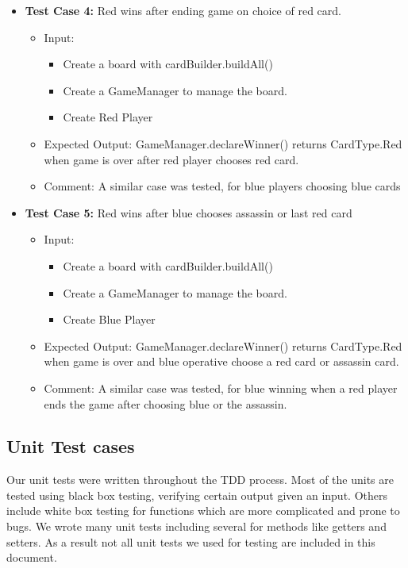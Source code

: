 \documentclass[12pt]{article}
\begin{document}
\begin{itemize}
    \item \textbf{Test Case 4:} Red wins after ending game on choice of red card.
        \begin{itemize}
        \item Input:
            \begin{itemize}
                \item Create a board with cardBuilder.buildAll()
                \item Create a GameManager to manage the board.
                \item Create Red Player
            \end{itemize}
        \item Expected Output: GameManager.declareWinner() returns CardType.Red when game is over after red player chooses red card.
        \item Comment: A similar case was tested, for blue players choosing blue cards
    \end{itemize}
    
    \item \textbf{Test Case 5:} Red wins after blue chooses assassin or last red card
        \begin{itemize}
        \item Input:
            \begin{itemize}
                \item Create a board with cardBuilder.buildAll()
                \item Create a GameManager to manage the board.
                \item Create Blue Player
            \end{itemize}
        \item Expected Output: GameManager.declareWinner() returns CardType.Red when game is over and blue operative choose a red card or assassin card.
        \item Comment: A similar case was tested, for blue winning when a red player ends the game after choosing blue or the assassin.
    \end{itemize}

\end{itemize}


\subsection{Unit Test cases}

Our unit tests were written throughout the TDD process. Most of the units are tested using black box testing, verifying certain output given an input. Others include white box testing for functions which are more complicated and prone to bugs. We wrote many unit tests including several for methods like getters and setters. As a result not all unit tests we used for testing are included in this document.
\end{document}
